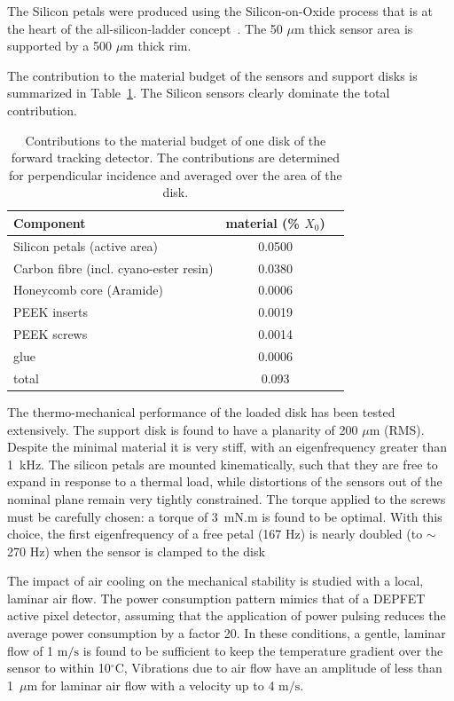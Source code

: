 The Silicon petals were produced using the Silicon-on-Oxide process that is at the heart of the
all-silicon-ladder concept~\cite{Andricek:2004cj}. The 50 $\mu \mathrm{m}$ thick sensor area is supported by a 500 $\mu \mathrm{m}$ thick rim.

The contribution to the material budget of the sensors and support disks is 
summarized in Table~\ref{tab:ftd_disk_material_budget}. The Silicon sensors clearly
dominate the total contribution.

\begin{table}[]
    \centering
    \begin{tabular}{lcc}
    \toprule
    Component                      & material (\% $X_0$) \\ \midrule
    Silicon petals (active area)  &         0.0500 \\
    Carbon fibre (incl. cyano-ester resin)     &   0.0380 \\
    Honeycomb core (Aramide)      &   0.0006 \\
    PEEK inserts                  &   0.0019 \\
    PEEK screws                   &   0.0014 \\
    glue                          &   0.0006  \\ \midrule
    total                         &     0.093      \\ \bottomrule
    \end{tabular}
    \caption{Contributions to the material budget of one disk of the forward tracking detector. The contributions are determined for perpendicular incidence and averaged over the area
    of the disk.}
    \label{tab:ftd_disk_material_budget}
\end{table}

The thermo-mechanical performance of the loaded disk has been tested extensively. The 
support disk is found to have a planarity of 200 $\mu \mathrm{m}$ (RMS). Despite the 
minimal material it is very stiff, with an eigenfrequency greater than 1~kHz. The
silicon petals are mounted kinematically, such that they are free to expand in response
to a thermal load, while distortions of the sensors out of the nominal plane remain
very tightly constrained. The torque applied to the screws must be carefully
chosen: a torque of 3~mN.m is found to be optimal. 
With this choice, the first eigenfrequency of a free petal (167 Hz) is nearly
doubled (to $\sim$ 270 Hz) when the sensor is clamped to the disk 

The impact of air cooling on the mechanical stability is studied with a local, 
laminar air flow. The power consumption pattern mimics that of a DEPFET
active pixel detector, assuming that the application of power pulsing reduces
the average power consumption by a factor 20.
In these conditions, a gentle, laminar flow of 1 $\mathrm{m/s}$ is found to be sufficient
to keep the temperature gradient over the sensor to within 10$^{\circ}$C, 
Vibrations due to air flow have an  amplitude of less than 1~$\mu \mathrm{m}$ 
for laminar air flow with a velocity up to 4 $\mathrm{m/s}$. 


